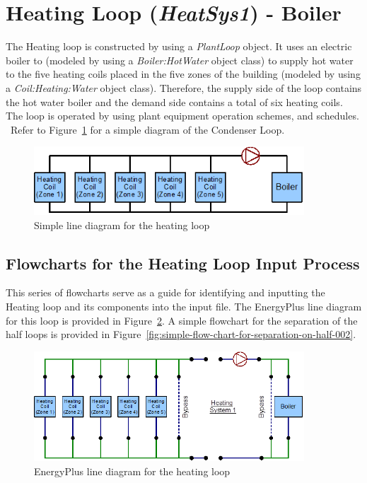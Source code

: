 \section{\texorpdfstring{Heating Loop (\emph{HeatSys1}) - Boiler}{Heating Loop (HeatSys1) - Boiler}}\label{heating-loop-heatsys1---boiler}

The Heating loop is constructed by using a \emph{PlantLoop} object. It uses an electric boiler to (modeled by using a \emph{Boiler:HotWater} object class) to supply hot water to the five heating coils placed in the five zones of the building (modeled by using a \emph{Coil:Heating:Water} object class). Therefore, the supply side of the loop contains the hot water boiler and the demand side contains a total of six heating coils. The loop is operated by using plant equipment operation schemes, and schedules. ~Refer to Figure~\ref{fig:simple-line-diagram-for-the-heating-loop} for a simple diagram of the Condenser Loop.

\begin{figure}[hbtp] %
\centering
\includegraphics[width=0.9\textwidth, height=0.9\textheight, keepaspectratio=true]{media/image074.png}
\caption{Simple line diagram for the heating loop \protect \label{fig:simple-line-diagram-for-the-heating-loop}}
\end{figure}

\subsection{Flowcharts for the Heating Loop Input Process}\label{flowcharts-for-the-heating-loop-input-process}

This series of flowcharts serve as a guide for identifying and inputting the Heating loop and its components into the input file. The EnergyPlus line diagram for this loop is provided in Figure~\ref{fig:energyplus-line-diagram-for-the-heating-loop}. A simple flowchart for the separation of the half loops is provided in Figure~\ref{fig:simple-flow-chart-for-separation-on-half-002}.

\begin{figure}[hbtp] %
\centering
\includegraphics[width=0.9\textwidth, height=0.9\textheight, keepaspectratio=true]{media/image075.png}
\caption{EnergyPlus line diagram for the heating loop \protect \label{fig:energyplus-line-diagram-for-the-heating-loop}}
\end{figure}

